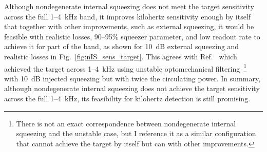 Although nondegenerate internal squeezing does not meet the target sensitivity across the full 1--4~kHz band, it improves kilohertz sensitivity enough by itself that together with other improvements, such as external squeezing, it would be feasible with realistic losses, 90--95$\%$ squeezer parameter, and low readout rate to achieve it for part of the band, as shown for 10~dB external squeezing and realistic losses in Fig.~\ref{fig:nIS_sens_target}. This agrees with Ref.~\cite{miaoDesignGravitationalWaveDetectors2018} which achieved the target across 1--4~kHz using unstable optomechanical filtering~\footnote{There is not an exact correspondence between nondegenerate internal squeezing and the unstable case, but I reference it as a similar configuration that cannot achieve the target by itself but can with other improvements.} with 10~dB injected squeezing but with twice the circulating power. %
In summary, although nondegenerate internal squeezing does not achieve the target sensitivity across the full 1--4~kHz, its feasibility for kilohertz detection is still promising.


\label{sec:signalRO_broadband}


